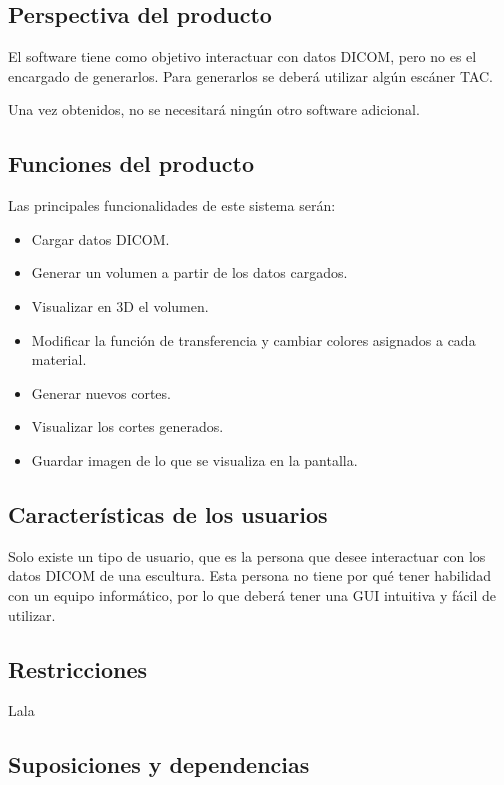 \subsection{Perspectiva del producto}

El software \myTitle tiene como objetivo interactuar con datos DICOM, pero no es el encargado de generarlos. Para generarlos se deberá utilizar algún escáner TAC.

Una vez obtenidos, no se necesitará ningún otro software adicional.

\subsection{Funciones del producto}

Las principales funcionalidades de este sistema serán:
\begin{itemize}
	\item Cargar datos DICOM.
	\item Generar un volumen a partir de los datos cargados.
	\item Visualizar en 3D el volumen.
	\item Modificar la función de transferencia y cambiar colores asignados a cada material.
	\item Generar nuevos cortes.
	\item Visualizar los cortes generados.
	\item Guardar imagen de lo que se visualiza en la pantalla.
\end{itemize}

\subsection{Características de los usuarios}

Solo existe un tipo de usuario, que es la persona que desee interactuar con los datos DICOM de una escultura. Esta persona no tiene por qué tener habilidad con un equipo informático, por lo que \myTitle deberá tener una GUI intuitiva y fácil de utilizar.

\subsection{Restricciones}

Lala

\subsection{Suposiciones y dependencias}


